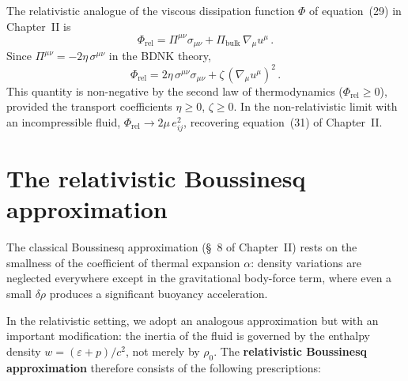 The relativistic analogue of the viscous dissipation function $\Phi$ of
equation~(29) in Chapter~II is
\begin{equation}
\label{eq:rel2-18}
  \Phi_{\mathrm{rel}} = \Pi^{\mu\nu}\sigma_{\mu\nu}
    + \Pi_{\mathrm{bulk}}\,\nabla_\mu u^\mu\,.
\end{equation}
Since $\Pi^{\mu\nu} = -2\eta\,\sigma^{\mu\nu}$ in the BDNK theory,
\begin{equation}
\label{eq:rel2-18b}
  \Phi_{\mathrm{rel}} = 2\eta\,\sigma^{\mu\nu}\sigma_{\mu\nu}
    + \zeta\,(\nabla_\mu u^\mu)^2\,.
\end{equation}
This quantity is non-negative by the second law of thermodynamics
($\Phi_{\mathrm{rel}} \ge 0$), provided the transport coefficients
$\eta \ge 0$, $\zeta \ge 0$.  In the non-relativistic limit
with an incompressible fluid, $\Phi_{\mathrm{rel}} \to 2\mu\,e_{ij}^2$,
recovering equation~(31) of Chapter~II.

\section{The relativistic Boussinesq approximation}\label{sec:rel8}

The classical Boussinesq approximation (\S~8 of Chapter~II) rests on the
smallness of the coefficient of thermal expansion $\alpha$: density
variations are neglected everywhere except in the gravitational body-force
term, where even a small $\delta\rho$ produces a significant buoyancy
acceleration.

In the relativistic setting, we adopt an analogous approximation but with
an important modification: the inertia of the fluid is governed by the
enthalpy density $w = (\varepsilon + p)/c^2$, not merely by $\rho_0$.
The \textbf{relativistic Boussinesq approximation} therefore consists of the
following prescriptions:


